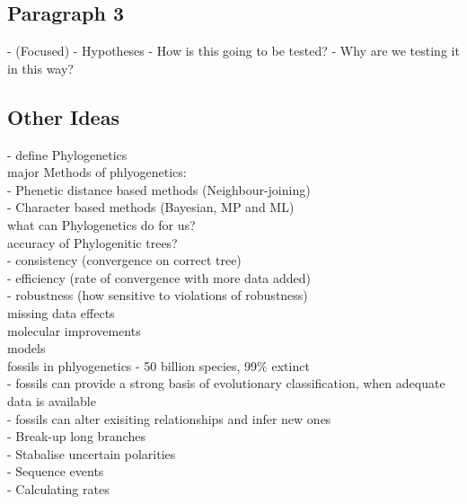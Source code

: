 \documentclass[a4paper,11pt]{article}
\begin{document}
\subsection{Paragraph 3}
- (Focused)
- Hypotheses
- How is this going to be tested? 
- Why are we testing it in this way?

\subsection{Other Ideas}
- define Phylogenetics\\
major Methods of phlyogenetics:\\ 
- Phenetic distance based methods (Neighbour-joining)\\
- Character based methods (Bayesian, MP and ML)\\
what can Phylogenetics do for us?\\

accuracy of Phylogenitic trees?\\
- consistency (convergence on correct tree)\\
- efficiency (rate of convergence with more data added)\\
- robustness (how sensitive to violations of robustness)\\

missing data effects\\

molecular improvements\\

models\\

fossils in phlyogenetics - 50 billion species, 99\% extinct \\
- fossils can provide a strong basis of evolutionary classification, when adequate data is available \\
- fossils can alter exisiting relationships and infer new ones\\
- Break-up long branches\\
- Stabalise uncertain polarities\\
- Sequence events\\
- Calculating rates\\
\end{document}

